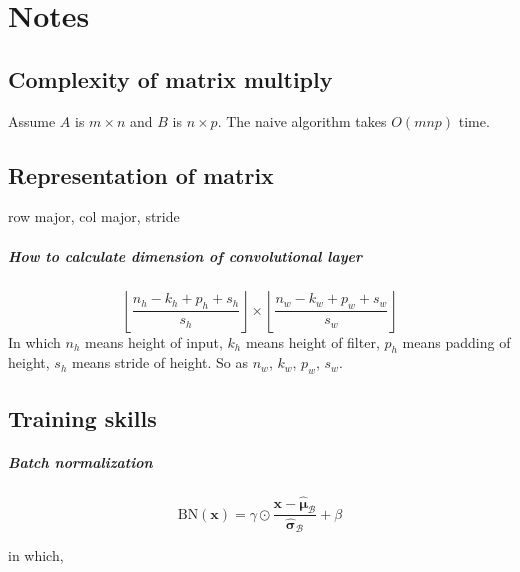 \chapter{Notes} %
\label{chap:Notes}

\section{Complexity of matrix multiply} %
\label{sec:Complexity of matrix multiply}

Assume $A$ is $m\times n$ and $B$ is $n\times p$.
The naive algorithm takes $O\left(mnp\right)$ time.



\section{Representation of matrix} %
\label{sec:Representation of matrix}

row major, col major, stride


\paragraph{How to calculate dimension of convolutional layer} %

\[ \left\lfloor \frac{n_h - k_h + p_h + s_h}{s_h} \right\rfloor \times \left\lfloor \frac{n_w - k_w + p_w + s_w}{s_w} \right\rfloor \]
In which  \(n_h\)  means height of input, \(k_h\) means height of filter, \(p_h\) means padding of height, \(s_h\) means stride of height. So as \(n_w\), \(k_w\), \(p_w\), \(s_w\).


\section{Training skills} %
\label{sec:Training skills}


\paragraph{Batch normalization}

\[
    \mathrm{BN}(\bm{x})  = \gamma  \odot \frac{\bm{x} - \hat{\bm \mu}_\mathcal{B}}{\hat{\bm \sigma}_\mathcal{B}} + \beta
\]

in which,








